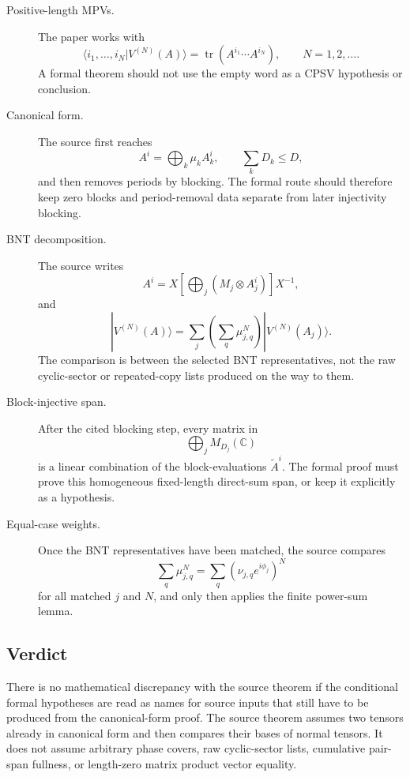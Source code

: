 \documentclass{article}
\begin{document}
\begin{description}
  \item[Positive-length MPVs.]
  The paper works with
  \[
    \langle i_1,\ldots,i_N|V^{(N)}(A)\rangle
      = \operatorname{tr}(A^{i_1}\cdots A^{i_N}),
    \qquad N=1,2,\ldots.
  \]
  A formal theorem should not use the empty word as a CPSV hypothesis or
  conclusion.

  \item[Canonical form.]
  The source first reaches
  \[
    A^i=\bigoplus_k \mu_k A_k^i,\qquad \sum_k D_k\le D,
  \]
  and then removes periods by blocking. The formal route should therefore keep
  zero blocks and period-removal data separate from later injectivity blocking.

  \item[BNT decomposition.]
  The source writes
  \[
    A^i=X\left[\bigoplus_j(M_j\otimes A_j^i)\right]X^{-1},
  \]
  and
  \[
    |V^{(N)}(A)\rangle
      =\sum_j\left(\sum_q\mu_{j,q}^N\right)|V^{(N)}(A_j)\rangle.
  \]
  The comparison is between the selected BNT representatives, not the raw
  cyclic-sector or repeated-copy lists produced on the way to them.

  \item[Block-injective span.]
  After the cited blocking step, every matrix in
  \[
    \bigoplus_jM_{D_j}(\mathbb C)
  \]
  is a linear combination of the block-evaluations $\tilde A^i$. The formal
  proof must prove this homogeneous fixed-length direct-sum span, or keep it
  explicitly as a hypothesis.

  \item[Equal-case weights.]
  Once the BNT representatives have been matched, the source compares
  \[
    \sum_q\mu_{j,q}^N
      =
    \sum_q(\nu_{j,q}e^{i\phi_j})^N
  \]
  for all matched $j$ and $N$, and only then applies the finite power-sum
  lemma.
\end{description}

\subsection{Verdict}

There is no mathematical discrepancy with the source theorem if the conditional
formal hypotheses are read as names for source inputs that still have to be
produced from the canonical-form proof. The source theorem assumes two tensors
already in canonical form and then compares their bases of normal tensors. It
does not assume arbitrary phase covers, raw cyclic-sector lists, cumulative
pair-span fullness, or length-zero matrix product vector equality.
\end{document}
